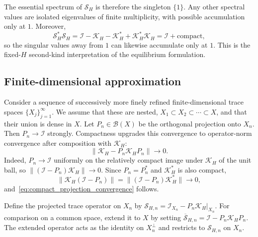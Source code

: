 \documentclass[final,onefignum,onetabnum]{siamart250211}
\theoremstyle{definition}
\begin{document}
The essential spectrum of $\mathcal S_H$ is therefore the singleton $\{1\}$.  Any other spectral values are isolated eigenvalues of finite multiplicity, with possible accumulation only at $1$.  Moreover,
\[
  \mathcal S_H^*\mathcal S_H
  =\mathcal I-\mathcal K_H-\mathcal K_H^*+\mathcal K_H^*\mathcal K_H
  =\mathcal I+\text{compact},
\]
so the singular values away from $1$ can likewise accumulate only at $1$.  This is the fixed-$H$ second-kind interpretation of the equilibrium formulation.

\subsection{Finite-dimensional approximation}
Consider a sequence of successively more finely refined finite-dimensional trace spaces $\{X_{j}\}_{j=1}^{\infty}$.
We assume that these are nested, $X_1\subset X_2\subset\cdots\subset X$,
and that their union is dense in $X$. Let $P_n\in\mathcal{B}(X)$ be the orthogonal projection onto $X_n$. Then $P_n\to\mathcal I$ strongly. Compactness upgrades this convergence to operator-norm convergence after composition with $\mathcal K_H$:
\begin{equation}
  \|\mathcal K_H-P_n\mathcal K_HP_n\|\longrightarrow0.
  \label{eq:compact_projection_convergence}
\end{equation}
Indeed, $P_n\to\mathcal I$ uniformly on the relatively compact image under $\mathcal K_H$ of the unit ball, so $\|(\mathcal I-P_n)\mathcal K_H\|\to0$.  Since $P_n=P_n^*$ and $\mathcal K_H^*$ is also compact,
\[
  \|\mathcal K_H(\mathcal I-P_n)\|
  =\|(\mathcal I-P_n)\mathcal K_H^*\|\to0,
\]
and~\eqref{eq:compact_projection_convergence} follows.

Define the projected trace operator on $X_n$ by
  $\mathcal S_{H,n}
  =\mathcal I_{X_n}-P_n\mathcal K_H\big|_{X_n}$.
For comparison on a common space, extend it to $X$ by setting
  $\overline{\mathcal S}_{H,n}
  =\mathcal I-P_n\mathcal K_HP_n$.
The extended operator acts as the identity on $X_n^\perp$ and restricts to $\mathcal S_{H,n}$ on $X_n$.
\end{document}
